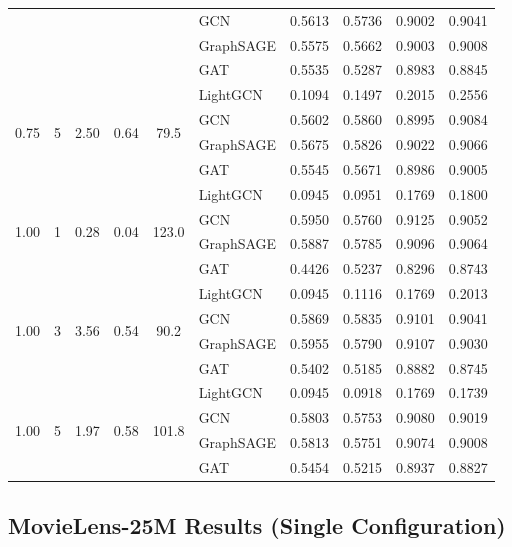 {\begin{longtable}{cccccl rrrr}
 & & & & & GCN & 0.5613 & 0.5736 & 0.9002 & 0.9041 \\
 & & & & & GraphSAGE & 0.5575 & 0.5662 & 0.9003 & 0.9008 \\
 & & & & & GAT & 0.5535 & 0.5287 & 0.8983 & 0.8845 \\
\midrule
\multirow{4}{*}{0.75} & \multirow{4}{*}{5} & \multirow{4}{*}{2.50} & \multirow{4}{*}{0.64} & \multirow{4}{*}{79.5} & LightGCN & 0.1094 & 0.1497 & 0.2015 & 0.2556 \\
 & & & & & GCN & 0.5602 & 0.5860 & 0.8995 & 0.9084 \\
 & & & & & GraphSAGE & 0.5675 & 0.5826 & 0.9022 & 0.9066 \\
 & & & & & GAT & 0.5545 & 0.5671 & 0.8986 & 0.9005 \\
\midrule
\multirow{4}{*}{1.00} & \multirow{4}{*}{1} & \multirow{4}{*}{0.28} & \multirow{4}{*}{0.04} & \multirow{4}{*}{123.0} & LightGCN & 0.0945 & 0.0951 & 0.1769 & 0.1800 \\
 & & & & & GCN & 0.5950 & 0.5760 & 0.9125 & 0.9052 \\
 & & & & & GraphSAGE & 0.5887 & 0.5785 & 0.9096 & 0.9064 \\
 & & & & & GAT & 0.4426 & 0.5237 & 0.8296 & 0.8743 \\
\midrule
\multirow{4}{*}{1.00} & \multirow{4}{*}{3} & \multirow{4}{*}{3.56} & \multirow{4}{*}{0.54} & \multirow{4}{*}{90.2} & LightGCN & 0.0945 & 0.1116 & 0.1769 & 0.2013 \\
 & & & & & GCN & 0.5869 & 0.5835 & 0.9101 & 0.9041 \\
 & & & & & GraphSAGE & 0.5955 & 0.5790 & 0.9107 & 0.9030 \\
 & & & & & GAT & 0.5402 & 0.5185 & 0.8882 & 0.8745 \\
\midrule
\multirow{4}{*}{1.00} & \multirow{4}{*}{5} & \multirow{4}{*}{1.97} & \multirow{4}{*}{0.58} & \multirow{4}{*}{101.8} & LightGCN & 0.0945 & 0.0918 & 0.1769 & 0.1739 \\
 & & & & & GCN & 0.5803 & 0.5753 & 0.9080 & 0.9019 \\
 & & & & & GraphSAGE & 0.5813 & 0.5751 & 0.9074 & 0.9008 \\
 & & & & & GAT & 0.5454 & 0.5215 & 0.8937 & 0.8827 \\
\midrule
\end{longtable}
}

\subsection*{MovieLens-25M Results (Single Configuration)}

